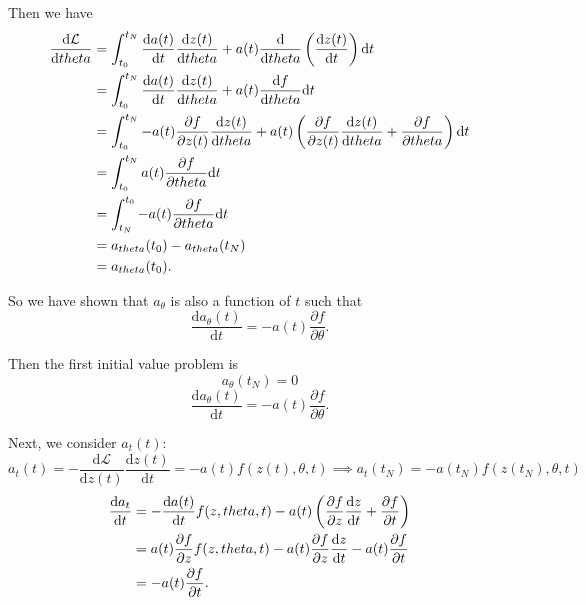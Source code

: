 \documentclass[a4paper,11pt,titlepage]{article}
\theoremstyle{definition}
\theoremstyle{plain}
\theoremstyle{remark}
\begin{document}
Then we have
\begin{align}
\frac{\mathrm{d}\mathcal{L}}{\mathrm{d}\theta}&=\int_{t_0}^{t_N}\frac{\mathrm{d}a(t)}{\mathrm{d}t}\frac{\mathrm{d} z(t)}{\mathrm{d}\theta}+a(t)\frac{\mathrm{d}}{\mathrm{d}\theta}\left(\frac{\mathrm{d}z(t)}{\mathrm{d}t}\right)\mathrm{d}t\notag\\
&=\int_{t_0}^{t_N}\frac{\mathrm{d}a(t)}{\mathrm{d}t}\frac{\mathrm{d}z(t)}{\mathrm{d}\theta}+a(t)\frac{\mathrm{d}f}{\mathrm{d}\theta}\mathrm{d}t\notag\\
&=\int_{t_0}^{t_N}-a(t)\frac{\partial f}{\partial z(t)}\frac{\mathrm{d}z(t)}{\mathrm{d}\theta}+a(t)\left(\frac{\partial f}{\partial z(t)}\frac{\mathrm{d}z(t)}{\mathrm{d}\theta}+\frac{\partial f}{\partial \theta}\right)\mathrm{d}t\notag\\
&=\int_{t_0}^{t_N}a(t)\frac{\partial f}{\partial \theta}\mathrm{d}t\notag\\
&=\int_{t_N}^{t_0}-a(t)\frac{\partial f}{\partial \theta}\mathrm{d}t\notag\\
&=a_{\theta}(t_0)-a_{\theta}(t_N)\notag\\
&=a_{\theta}(t_0).\notag
\end{align}

So we have shown that $a_{\theta}$ is also a function of $t$ such that $$\frac{\mathrm{d}a_{\theta}(t)}{\mathrm{d}t} = -a(t)\frac{\partial f}{\partial \theta}.$$

Then the first initial value problem is 
$$a_\theta(t_N)=0$$
\begin{equation}\label{eq6}
    \frac{\mathrm{d}a_{\theta}(t)}{\mathrm{d}t} = -a(t)\frac{\partial f}{\partial \theta}. \tag{6}
\end{equation}

Next, we consider $a_t(t)$:
$$
a_t(t) = -\frac{\mathrm{d}\mathcal{L}}{\mathrm{d} z(t)}\frac{\mathrm{d} z(t)}{\mathrm{d}t}=-a(t)f(z(t),\theta, t)\implies a_t(t_N) = -a(t_N)f(z(t_N),\theta, t)
$$
\begin{align}
\frac{\mathrm{d}a_t}{\mathrm{d}t}&=-\frac{\mathrm{d}a(t)}{\mathrm{d}t}f(z,\theta,t)-a(t)\left(\frac{\partial f}{\partial z}\frac{\mathrm{d}z}{\mathrm{d}t}+\frac{\partial f}{\partial t}\right)\notag\\
&=a(t)\frac{\partial f}{\partial z}f(z,\theta,t)-a(t)\frac{\partial f}{\partial z}\frac{\mathrm{d}z}{\mathrm{d}t}-a(t)\frac{\partial f}{\partial t}\notag\\
&=-a(t)\frac{\partial f}{\partial t}.\notag
\end{align}
\end{document}
